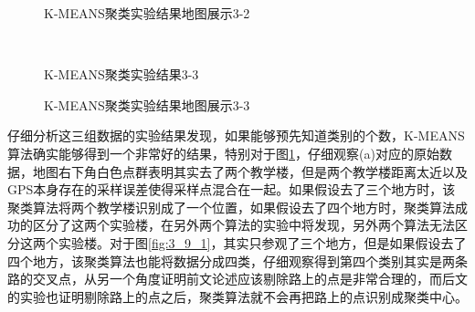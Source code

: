 \begin{figure}[htb]
  \centering%
  \caption{K-MEANS聚类实验结果地图展示3-2}
  \label{fig:3_9_2}
\end{figure}
\begin{figure}[htb]
  \centering%
  \\
  \caption{K-MEANS聚类实验结果3-3}
  \label{fig:3_8_3}
\end{figure}
\begin{figure}[htb]
  \centering%
  \caption{K-MEANS聚类实验结果地图展示3-3}
  \label{fig:3_9_3}
\end{figure}
\par 仔细分析这三组数据的实验结果发现，如果能够预先知道类别的个数，K-MEANS算法确实能够得到一个非常好的结果，特别对于图\ref{fig:3_9_2}，仔细观察(a)对应的原始数据，地图右下角白色点群表明其实去了两个教学楼，但是两个教学楼距离太近以及GPS本身存在的采样误差使得采样点混合在一起。如果假设去了三个地方时，该聚类算法将两个教学楼识别成了一个位置，如果假设去了四个地方时，聚类算法成功的区分了这两个实验楼，在另外两个算法的实验中将发现，另外两个算法无法区分这两个实验楼。对于图\ref{fig:3_9_1}，其实只参观了三个地方，但是如果假设去了四个地方，该聚类算法也能将数据分成四类，仔细观察得到第四个类别其实是两条路的交叉点，从另一个角度证明前文论述应该剔除路上的点是非常合理的，而后文的实验也证明剔除路上的点之后，聚类算法就不会再把路上的点识别成聚类中心。

